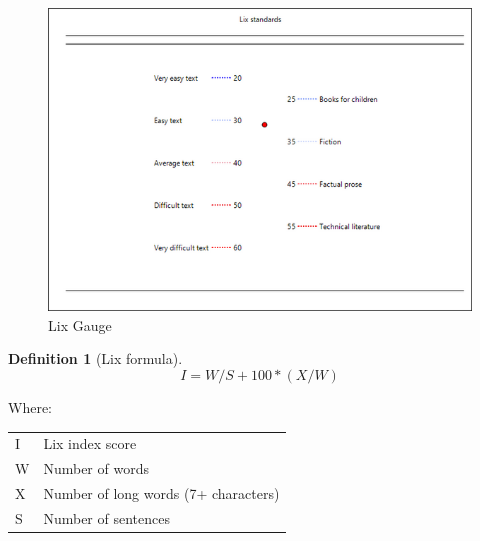 \documentclass[
]{book}
\theoremstyle{definition}
\newtheorem{definition}{Definition}[chapter]
\theoremstyle{definition}
\theoremstyle{definition}
\theoremstyle{definition}
\theoremstyle{remark}
\begin{document}
\begin{figure}[H]

{\centering \includegraphics[width=0.75\linewidth,]{Images/LixGauge} 

}

\caption{Lix Gauge}\label{fig:lixGauge}
\end{figure}

\begin{definition}[Lix formula]
\protect\hypertarget{def:lix}{}{\label{def:lix} {} }\[
I = W/S + 100*(X/W)
\]
\end{definition}

Where:

\begin{longtable}[]{@{}
  >{\raggedright\arraybackslash}p{}
  >{\raggedright\arraybackslash}p{}@{}}
\toprule
\endhead
I & Lix index score \\
W & Number of words \\
X & Number of long words (7+ characters) \\
S & Number of sentences \\
\bottomrule
\end{longtable}
\end{document}
